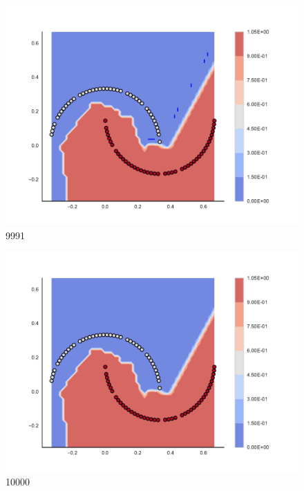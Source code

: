\begin{subfigure}[b]{0.09\textwidth}
    \includegraphics[clip, trim=2.35cm 1.75cm 4.5cm 0cm,width=\textwidth]{img/convergence/9991.pdf}
    \caption{9991}
    \label{fig:convergence_9991}
\end{subfigure}
%
\begin{subfigure}[b]{0.09\textwidth}
    \includegraphics[clip, trim=2.35cm 1.75cm 4.5cm 0cm,width=\textwidth]{img/convergence/10000.pdf}
    \caption{10000}
    \label{fig:convergence_10000}
\end{subfigure}
%
